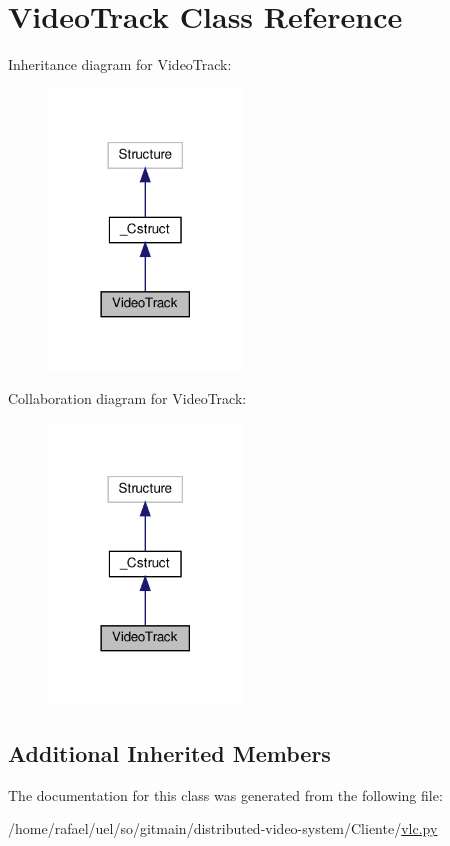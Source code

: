 \hypertarget{classvlc_1_1_video_track}{}\section{Video\+Track Class Reference}
\label{classvlc_1_1_video_track}


Inheritance diagram for Video\+Track\+:
\nopagebreak
\begin{figure}[H]
\begin{center}
\leavevmode
\includegraphics[width=146pt]{classvlc_1_1_video_track__inherit__graph}
\end{center}
\end{figure}


Collaboration diagram for Video\+Track\+:
\nopagebreak
\begin{figure}[H]
\begin{center}
\leavevmode
\includegraphics[width=146pt]{classvlc_1_1_video_track__coll__graph}
\end{center}
\end{figure}
\subsection*{Additional Inherited Members}


The documentation for this class was generated from the following file\+:\begin{DoxyCompactItemize}
\item 
/home/rafael/uel/so/gitmain/distributed-\/video-\/system/\+Cliente/\hyperlink{vlc_8py}{vlc.\+py}\end{DoxyCompactItemize}
